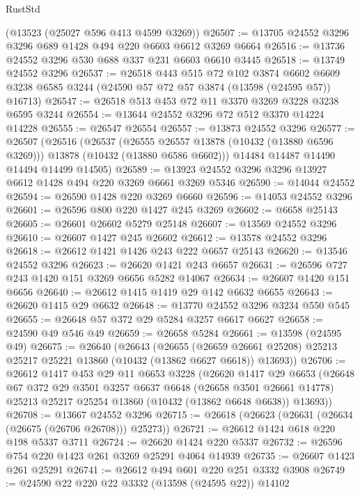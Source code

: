 \begin{lexlean}{RustStd}
\begin{coremodule}
    (@13523 (@25027 @596 @413 @4599 @3269))
@26507 := @13705 @24552 @3296 @3296 @689 @1428 @494 @220 @6603 @6612 @3269 @6664
@26516 := @13736 @24552 @3296 @530 @688 @337 @231 @6603 @6610 @3445
@26518 := @13749 @24552 @3296
@26537 := @26518
    @443
    @515
    @72
    @102
    @3874
    @6602
    @6609
    @3238
    @6585
    @3244
    (@24590 @57 @72 @57 @3874 (@13598 (@24595 @57)) @16713)
@26547 := @26518 @513 @453 @72 @11 @3370 @3269 @3228 @3238 @6595 @3244
@26554 := @13644 @24552 @3296 @72 @512 @3370 @14224 @14228
@26555 := @26547 @26554
@26557 := @13873 @24552 @3296
@26577 := @26507
    (@26516
      (@26537
        (@26555 @26557 @13878 (@10432 (@13880 @6596 @3269)))
        @13878
        (@10432 (@13880 @6586 @6602)))
      @14484
      @14487
      @14490
      @14494
      @14499
      @14505)
@26589 := @13923 @24552 @3296 @3296 @13927 @6612 @1428 @494 @220 @3269 @6661 @3269 @5346
@26590 := @14044 @24552
@26594 := @26590 @1428 @220 @3269 @6660
@26596 := @14053 @24552 @3296
@26601 := @26596 @800 @220 @1427 @245 @3269
@26602 := @6658 @25143
@26605 := @26601 @26602 @5279 @25148
@26607 := @13569 @24552 @3296
@26610 := @26607 @1427 @245 @26602
@26612 := @13578 @24552 @3296
@26618 := @26612 @1421 @1426 @243 @222 @6657 @25143
@26620 := @13546 @24552 @3296
@26623 := @26620 @1421 @243 @6657
@26631 := @26596 @727 @243 @1420 @151 @3269 @6656 @5282 @14067
@26634 := @26607 @1420 @151 @6656
@26640 := @26612 @1415 @1419 @29 @142 @6632 @6655
@26643 := @26620 @1415 @29 @6632
@26648 := @13770 @24552 @3296 @3234 @550 @545
@26655 := @26648 @57 @372 @29 @5284 @3257 @6617 @6627
@26658 := @24590 @49 @546 @49
@26659 := @26658 @5284
@26661 := @13598 (@24595 @49)
@26675 := @26640
    (@26643
      (@26655
        (@26659 @26661 @25208)
        @25213
        @25217
        @25221
        @13860
        (@10432 (@13862 @6627 @6618))
        @13693))
@26706 := @26612
    @1417
    @453
    @29
    @11
    @6653
    @3228
    (@26620
      @1417
      @29
      @6653
      (@26648
        @67
        @372
        @29
        @3501
        @3257
        @6637
        @6648
        (@26658 @3501 @26661 @14778)
        @25213
        @25217
        @25254
        @13860
        (@10432 (@13862 @6648 @6638))
        @13693))
@26708 := @13667 @24552 @3296
@26715 := @26618 (@26623 (@26631 (@26634 (@26675 (@26706 @26708))) @25273))
@26721 := @26612 @1424 @618 @220 @198 @5337 @3711
@26724 := @26620 @1424 @220 @5337
@26732 := @26596 @754 @220 @1423 @261 @3269 @25291 @4064 @14939
@26735 := @26607 @1423 @261 @25291
@26741 := @26612 @494 @601 @220 @251 @3332 @3908
@26749 := @24590 @22 @220 @22 @3332 (@13598 (@24595 @22)) @14102

\end{coremodule}
\end{lexlean}
